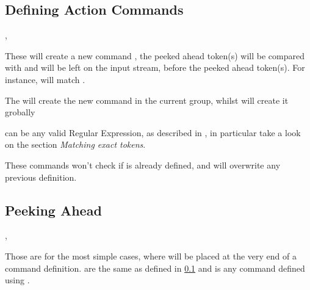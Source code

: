 \documentclass[10pt]{article}
\begin{document}
\subsection{Defining Action Commands}\label{cmd-def-2e}
\begin{codedescribe}{\xpeekSetCmd, \xpeekSetCmdGlobal}
\begin{codesyntax}%
\end{codesyntax}
These will create a new command , the peeked ahead token(s) will be compared with  and  will be left on the input stream, before the peeked ahead token(s). For instance,  will match \tsobj[verb]{\begin{envx}}.

The \tsobj{\xpeekSetCmd} will create the new command in the current group, whilst  \tsobj{\xpeekSetCmdGlobal} will create it grobally
\end{codedescribe}
\begin{tsremark}
   can be any valid Regular Expression, as described in \cite{expl3}, in particular take a look on the section \emph{Matching exact tokens}.
\end{tsremark}
\begin{tsremark}
  These commands won't check if  is already defined, and will overwrite any previous definition.
\end{tsremark}


\subsection{Peeking Ahead}\label{peek-2e}

\begin{codedescribe}{\xpeekTokCmd, \xpeekTok}
\begin{codesyntax}%
\end{codesyntax}
Those are for the most simple cases, where \tsobj[code,sep=or]{\xpeekTokCmd,\xpeekTok} will be placed at the very end of a command definition.  are the same as defined in \ref{cmd-def-2e} and  is any command defined using \tsobj[code,sep=or]{\xpeekSetCmd, \xpeekSetCmdGlobal}.
\end{codedescribe}
\end{document}
